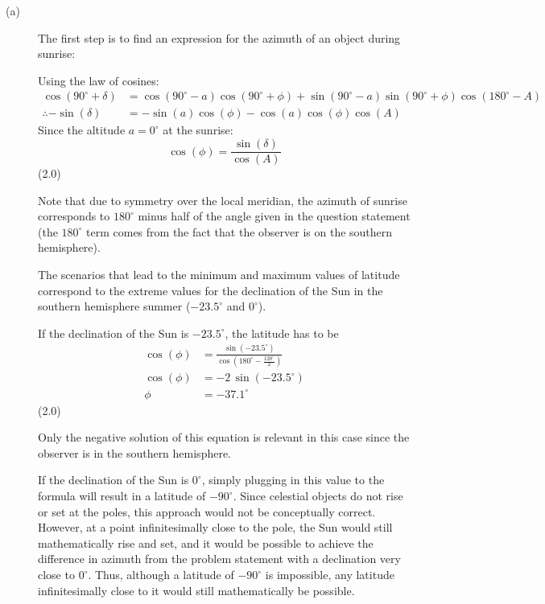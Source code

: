 \begin{description}
\item[(a)] The first step is to find an expression for the azimuth of an
  object during sunrise:


  Using the law of cosines:
  \begin{align*}
    \cos(90^\circ + \delta)
      &= \cos(90^\circ - a)\cos(90^\circ + \phi)
       + \sin(90^\circ - a)\sin(90^\circ + \phi)\cos(180^\circ - A)\\
    \therefore -\sin(\delta)
      &= -\sin(a)\cos(\phi) - \cos(a)\cos(\phi)\cos(A)
  \end{align*}
  Since the altitude $a = 0^\circ$ at the sunrise:
  \[
    \cos(\phi) = \frac{\sin(\delta)}{\cos(A)}
  \]
  \hfill(2.0)

  Note that due to symmetry over the local meridian, the azimuth of sunrise
  corresponds to $180^\circ$ minus half of the angle given in the question
  statement (the $180^\circ$ term comes from the fact that the observer is on
  the southern hemisphere).

  The scenarios that lead to the minimum and maximum values of latitude
  correspond to the extreme values for the declination of the Sun in the
  southern hemisphere summer ($-23.5^\circ$ and $0^\circ$).

  If the declination of the Sun is $-23.5^\circ$, the latitude has to be
  \begin{align*}
    \cos(\phi) &= \frac{\sin(-23.5^\circ)}
                       {\cos\left(180^\circ - \frac{120^\circ}{2}\right)}\\
    \cos(\phi) &= -2\,\sin(-23.5^\circ)\\
    \phi &= -37.1^\circ
  \end{align*}
  \hfill(2.0)

  Only the negative solution of this equation is relevant in this case since
  the observer is in the southern hemisphere.

  If the declination of the Sun is $0^\circ$, simply plugging in this value to
  the formula will result in a latitude of $-90^\circ$. Since celestial
  objects do not rise or set at the poles, this approach would not be
  conceptually correct. However, at a point infinitesimally close to the pole,
  the Sun would still mathematically rise and set, and it would be possible to
  achieve the difference in azimuth from the problem statement with a
  declination very close to $0^\circ$. Thus, although a latitude of
  $-90^\circ$ is impossible, any latitude infinitesimally close to it would
  still mathematically be possible.


\end{description}

